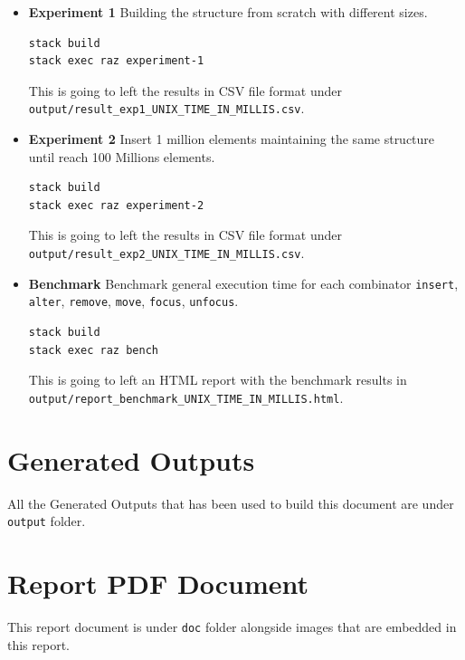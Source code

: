 \documentclass[12pt, a4paper]{article}
\begin{document}
\begin{itemize}
  \item \textbf{Experiment 1} Building the structure from scratch with different sizes.

\begin{verbatim}
stack build
stack exec raz experiment-1
\end{verbatim}

\setlength{\rightskip}{0pt plus 1 fil}
This is going to left the results in CSV file format under \texttt{output/result_exp1_UNIX_TIME_IN_MILLIS.csv}.


  \item \textbf{Experiment 2} Insert 1 million elements maintaining the same structure until reach 100 Millions elements.

\begin{verbatim}
stack build
stack exec raz experiment-2
\end{verbatim}

\setlength{\rightskip}{0pt plus 1 fil}
This is going to left the results in CSV file format under \texttt{output/result_exp2_UNIX_TIME_IN_MILLIS.csv}.

  \item \textbf{Benchmark} Benchmark general execution time for each combinator \texttt{insert},  \texttt{alter}, \texttt{remove}, \texttt{move}, \texttt{focus}, \texttt{unfocus}.

\begin{verbatim}
stack build
stack exec raz bench
\end{verbatim}

\setlength{\rightskip}{0pt plus 1 fil}
This is going to left an HTML report with the benchmark results in \texttt{output/report_benchmark_UNIX_TIME_IN_MILLIS.html}.


\end{itemize}

\section{Generated Outputs}\label{apx:reports}
All the Generated Outputs that has been used to build this document are under \texttt{output} folder.

\section{Report PDF Document}
This report document is under \texttt{doc} folder alongside images that are embedded in this report.
\end{document}
